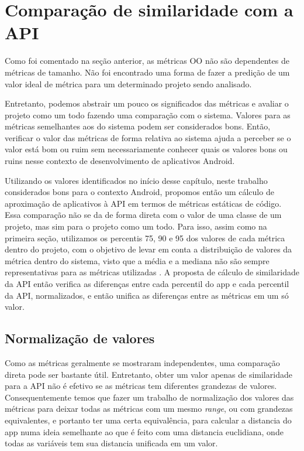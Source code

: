 \section{Comparação de similaridade com a API}

Como foi comentado na seção anterior, as métricas OO não são dependentes de métricas de tamanho. Não foi encontrado uma forma de fazer a predição de um valor ideal de métrica para um determinado projeto sendo analisado.  

Entretanto, podemos abstrair um pouco os significados das métricas e avaliar o projeto como um todo fazendo uma comparação com o sistema. Valores para as métricas semelhantes aos do sistema podem ser considerados bons. Então, verificar o valor das métricas de forma relativa ao sistema ajuda a perceber se o valor está bom ou ruim sem necessariamente conhecer quais os valores bons ou ruins nesse contexto de desenvolvimento de aplicativos Android. 

Utilizando os valores identificados no início desse capítulo, neste trabalho considerados bons para o contexto Android, propomos então um cálculo de aproximação de aplicativos à API em termos de métricas estáticas de código. Essa comparação não se da de forma direta com o valor de uma classe de um projeto, mas sim para o projeto como um todo. Para isso, assim como na primeira seção, utilizamos os percentis 75, 90 e 95 dos valores de cada métrica dentro do projeto, com o objetivo de levar em conta a distribuição de valores da métrica dentro do sistema, visto que a média e a mediana não são sempre representativas para as métricas utilizadas \cite{meirelles2013}. A proposta de cálculo de similaridade da API então verifica as diferenças entre cada percentil do app e cada percentil da API, normalizados, e então unifica as diferenças entre as métricas em um só valor. 

\subsection{Normalização de valores}

Como as métricas geralmente se mostraram independentes, uma comparação direta pode ser bastante útil. Entretanto, obter um valor apenas de similaridade para a API não é efetivo se as métricas tem diferentes grandezas de valores. Consequentemente temos que fazer um trabalho de normalização dos valores das métricas para deixar todas as métricas com um mesmo \textit{range}, ou com grandezas equivalentes, e portanto ter uma certa equivalência, para calcular a distancia do app numa ideia semelhante ao que é feito com uma distancia euclidiana, onde todas as variáveis tem sua distancia unificada em um valor.

